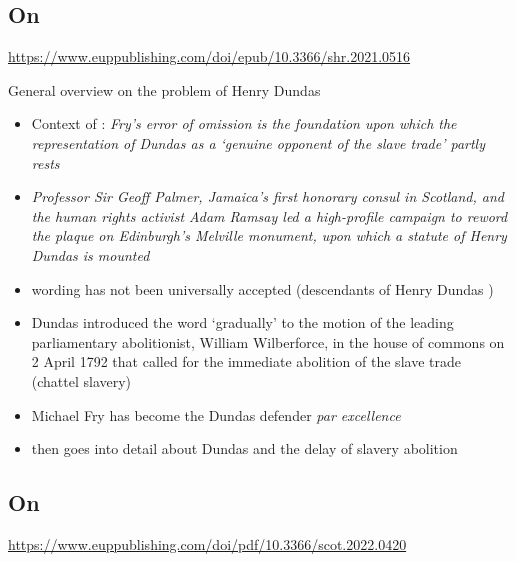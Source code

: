 \documentclass{scrartcl}
\begin{document}
\subsection{On \cite{mullen_2021}}

\url{https://www.euppublishing.com/doi/epub/10.3366/shr.2021.0516}

General overview on the problem of Henry Dundas
 
\begin{itemize}
    \item Context of \cite{fry_1992}: \textit{Fry’s error of omission is the foundation upon which the representation of Dundas as a ‘genuine opponent of the slave trade’ partly rests}
    \item \textit{Professor Sir Geoff Palmer, Jamaica’s first honorary consul in Scotland, and the human rights activist Adam Ramsay led a high-profile campaign to reword the plaque on Edinburgh’s Melville monument, upon which a statute of Henry Dundas is mounted}
    \item wording has not been universally accepted (descendants of Henry Dundas )
    \item Dundas introduced the word ‘gradually’ to the motion of the leading parliamentary abolitionist, William Wilberforce, in the house of commons on 2 April 1792 that called for the immediate abolition of the slave trade (chattel slavery)
    \item Michael Fry has become the Dundas defender \textit{par excellence}
    \item then goes into detail about Dundas and the delay of slavery abolition

\end{itemize}


\subsection{On \cite{mccarthy_2022_1}}

\url{https://www.euppublishing.com/doi/pdf/10.3366/scot.2022.0420}
\end{document}
